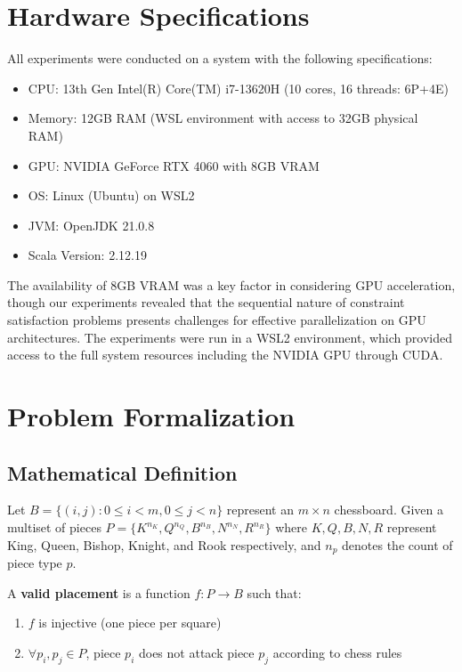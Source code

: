 \documentclass[12pt,a4paper]{article}
\theoremstyle{definition}
\begin{document}
\section{Hardware Specifications}

All experiments were conducted on a system with the following specifications:
\begin{itemize}
    \item CPU: 13th Gen Intel(R) Core(TM) i7-13620H (10 cores, 16 threads: 6P+4E)
    \item Memory: 12GB RAM (WSL environment with access to 32GB physical RAM)
    \item GPU: NVIDIA GeForce RTX 4060 with 8GB VRAM
    \item OS: Linux (Ubuntu) on WSL2
    \item JVM: OpenJDK 21.0.8
    \item Scala Version: 2.12.19
\end{itemize}

The availability of 8GB VRAM was a key factor in considering GPU acceleration, though our experiments revealed that the sequential nature of constraint satisfaction problems presents challenges for effective parallelization on GPU architectures. The experiments were run in a WSL2 environment, which provided access to the full system resources including the NVIDIA GPU through CUDA.

\section{Problem Formalization}

\subsection{Mathematical Definition}

Let $B = \{(i,j) : 0 \leq i < m, 0 \leq j < n\}$ represent an $m \times n$ chessboard. Given a multiset of pieces $P = \{K^{n_K}, Q^{n_Q}, B^{n_B}, N^{n_N}, R^{n_R}\}$ where $K, Q, B, N, R$ represent King, Queen, Bishop, Knight, and Rook respectively, and $n_p$ denotes the count of piece type $p$.

A \textbf{valid placement} is a function $f: P \rightarrow B$ such that:
\begin{enumerate}
\item $f$ is injective (one piece per square)
\item $\forall p_i, p_j \in P$, piece $p_i$ does not attack piece $p_j$ according to chess rules
\end{enumerate}
\end{document}

